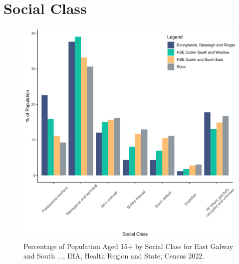 \documentclass{article}
\begin{document}
\section{Social Class}\label{sect:SC}
\begin{figure}[H]
	\centering
	\includegraphics[width = 140mm]{../figures/SocialClassED.pdf}
	\caption{Percentage of Population Aged 15+ by Social Class for East Galway and South ..., IHA, Health Region and State; Census 2022.}
	\label{fig:vbnv}
	\end{figure}
\end{document}

